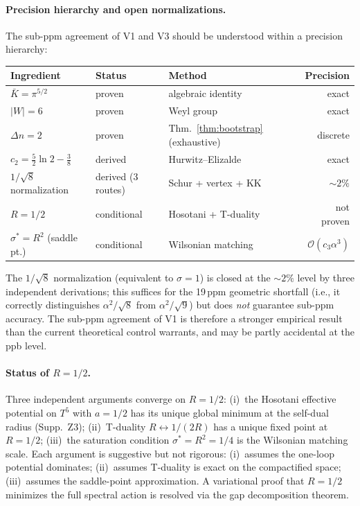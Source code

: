\documentclass[11pt,a4paper]{article}
\theoremstyle{definition}
\theoremstyle{remark}
\begin{document}
\paragraph{Precision hierarchy and open normalizations.}
The sub-ppm agreement of V1 and V3 should be understood within a
precision hierarchy:
\begin{center}
\renewcommand{\arraystretch}{1.15}\small
\begin{tabular}{lllr}
\toprule
\textbf{Ingredient} & \textbf{Status} & \textbf{Method} & \textbf{Precision}\\
\midrule
$\bar K=\pi^{5/2}$ & proven & algebraic identity & exact\\
$|W|=6$ & proven & Weyl group & exact\\
$\Delta n=2$ & proven & Thm.~\ref{thm:bootstrap} (exhaustive) & discrete\\
$c_2=\tfrac52\ln 2-\tfrac38$ & derived & Hurwitz--Elizalde & exact\\
$1/\!\sqrt{8}$ normalization & derived (3 routes) & Schur + vertex + KK & $\sim\!2\%$\\
$R=1/2$ & conditional & Hosotani + T-duality & not proven\\
$\sigma^*=R^2$ (saddle pt.) & conditional & Wilsonian matching & $\mathcal{O}(c_3\alpha^3)$\\
\bottomrule
\end{tabular}
\end{center}
\noindent
The $1/\!\sqrt{8}$ normalization (equivalent to $\sigma=1$) is closed
at the $\sim\!2\%$ level by three independent derivations; this
suffices for the 19\,ppm geometric shortfall (i.e., it correctly
distinguishes $\alpha^2/\!\sqrt{8}$ from $\alpha^2/\!\sqrt{9}$) but
does \emph{not} guarantee sub-ppm accuracy. The sub-ppm agreement of
V1 is therefore a stronger empirical result than the current
theoretical control warrants, and may be partly accidental at the ppb
level.

\paragraph{Status of $R=1/2$.}
Three independent arguments converge on $R=1/2$:
(i)~the Hosotani effective potential on $T^5$ with $a\!=\!1/2$ has its
unique global minimum at the self-dual radius (Supp.~Z3);
(ii)~T-duality $R\leftrightarrow 1/(2R)$ has a unique fixed point at
$R\!=\!1/2$;
(iii)~the saturation condition $\sigma^*\!=\!R^2\!=\!1/4$ is the
Wilsonian matching scale.
Each argument is suggestive but not rigorous: (i)~assumes the
one-loop potential dominates; (ii)~assumes T-duality is exact on the
compactified space; (iii)~assumes the saddle-point approximation.
A variational proof that $R\!=\!1/2$ minimizes the full spectral
action is resolved via the gap decomposition theorem.
\end{document}
